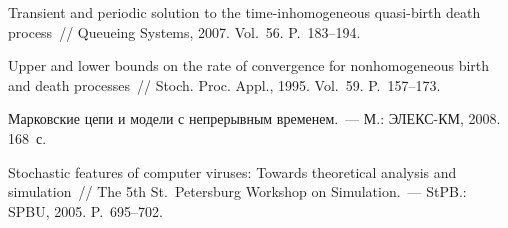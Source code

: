 \begin{multicols}{2}
{{\begin{thebibliography}{99}
Transient and periodic solution to the time-inhomogeneous quasi-birth 
death process~// Queueing Systems, 2007. Vol.~56. P.~183--194.

Upper and lower bounds on the
rate of convergence for nonhomogeneous birth and death proc\-esses~// 
Stoch. Proc.  Appl., 1995. Vol.~59. P.~157--173.

Марковские цепи и модели с непрерывным временем.~--- М.: ЭЛЕКС-КМ,
2008. 168~с.

 Stochastic features of computer viruses: Towards theoretical
analysis and simulation~// The 5th  St.\ Petersburg Workshop on
Simulation.~--- StPB.: SPBU, 2005. P.~695--702.

\end{thebibliography}
\label{end\stat}
} 
}
\end{multicols}